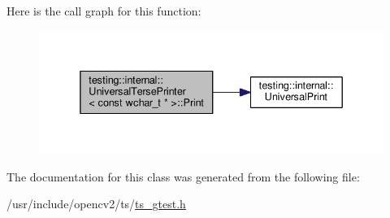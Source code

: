 Here is the call graph for this function\-:\nopagebreak
\begin{figure}[H]
\begin{center}
\leavevmode
\includegraphics[width=336pt]{classtesting_1_1internal_1_1UniversalTersePrinter_3_01const_01wchar__t_01_5_01_4_ad99eb231771a8ea0cb47c3422d38ad44_cgraph}
\end{center}
\end{figure}




The documentation for this class was generated from the following file\-:\begin{DoxyCompactItemize}
\item 
/usr/include/opencv2/ts/\hyperlink{ts__gtest_8h}{ts\-\_\-gtest.\-h}\end{DoxyCompactItemize}
